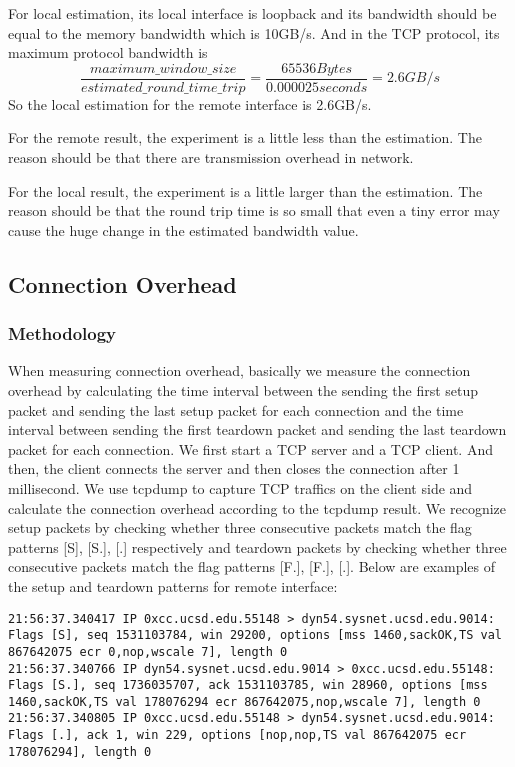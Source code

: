 For local estimation, its local interface is loopback and its bandwidth should be equal to the memory bandwidth which is 10GB/s. And in the TCP protocol, its maximum protocol bandwidth is $$\frac{maximum\_window\_size}{estimated\_round\_time\_trip} = \frac{65536 Bytes}{0.000025 seconds} = 2.6GB/s$$So the local estimation for the remote interface is 2.6GB/s.

For the remote result, the experiment is a little less than the estimation. The reason should be that there are transmission overhead in network.

For the local result, the experiment is a little larger than the estimation. The reason should be that the round trip time is so small that even a tiny error may cause the huge change in the estimated bandwidth value.

\subsection{Connection Overhead}

\subsubsection{Methodology}
When measuring connection overhead, basically we measure the connection overhead by calculating the time interval between the sending the first setup packet and sending the last setup packet for each connection and the time interval between sending the first teardown packet and sending the last teardown packet for each connection. We first start a TCP server and a TCP client. And then, the client connects the server and then closes the connection after 1 millisecond. We use tcpdump to capture TCP traffics on the client side and calculate the connection overhead according to the tcpdump result.  We recognize setup packets by checking whether three consecutive packets match the flag patterns [S], [S.], [.] respectively and teardown packets by checking whether three consecutive packets match the flag patterns [F.], [F.], [.]. Below are examples of the setup and teardown patterns for remote interface:

\begin{lstlisting}
21:56:37.340417 IP 0xcc.ucsd.edu.55148 > dyn54.sysnet.ucsd.edu.9014: Flags [S], seq 1531103784, win 29200, options [mss 1460,sackOK,TS val 867642075 ecr 0,nop,wscale 7], length 0
21:56:37.340766 IP dyn54.sysnet.ucsd.edu.9014 > 0xcc.ucsd.edu.55148: Flags [S.], seq 1736035707, ack 1531103785, win 28960, options [mss 1460,sackOK,TS val 178076294 ecr 867642075,nop,wscale 7], length 0
21:56:37.340805 IP 0xcc.ucsd.edu.55148 > dyn54.sysnet.ucsd.edu.9014: Flags [.], ack 1, win 229, options [nop,nop,TS val 867642075 ecr 178076294], length 0
\end{lstlisting}

